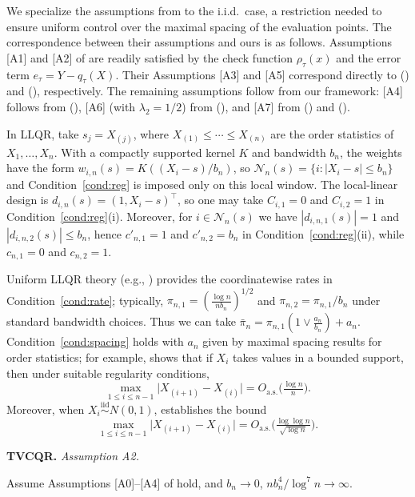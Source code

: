 \documentclass[lineno]{biometrika}
\begin{document}
\begin{remark}
We specialize the assumptions from \cite{kong2010uniform} to the i.i.d.\ case, a restriction needed to ensure uniform
control over the maximal spacing of the evaluation points. The correspondence between their assumptions and ours is as
follows. Assumptions [A1] and [A2] of \cite{kong2010uniform} are readily satisfied by the check function
$\rho_\tau(x)$ and the error term $e_\tau=Y-q_\tau(X)$. Their Assumptions [A3] and [A5] correspond directly to
() and (), respectively. The remaining assumptions follow from our framework: [A4] follows
from (), [A6] (with $\lambda_2=1/2$) from (), and [A7] from () and
().
\end{remark}

In LLQR, take $s_j=X_{(j)}$, where $X_{(1)}\le\cdots\le X_{(n)}$ are the order statistics of $X_1,\ldots,X_n$.
With a compactly supported kernel $K$ and bandwidth $b_n$, the weights have the form $w_{i,n}(s)=K((X_i-s)/b_n)$, so
$\mathcal N_n(s)=\{i:|X_i-s|\le b_n\}$ and Condition~\ref{cond:reg} is imposed only on this local window. The
local-linear design is $d_{i,n}(s)=(1,X_i-s)^\top$, so one may take $C_{i,1}=0$ and $C_{i,2}=1$ in
Condition~\ref{cond:reg}(i). Moreover, for $i\in\mathcal N_n(s)$ we have $|d_{i,n,1}(s)|=1$ and
$|d_{i,n,2}(s)|\le b_n$, hence $c'_{n,1}=1$ and $c'_{n,2}=b_n$ in Condition~\ref{cond:reg}(ii), while
$c_{n,1}=0$ and $c_{n,2}=1$.

Uniform LLQR theory (e.g., \cite{kong2010uniform}) provides the coordinatewise rates in Condition~\ref{cond:rate};
typically, $\pi_{n,1}= (\frac{\log n}{n b_n})^{1/2}$ and $\pi_{n,2}= \pi_{n,1}/b_n$ under standard bandwidth choices.
Thus we can take $\bar\pi_n=\pi_{n,1}(1\vee \frac{a_n}{b_n})+a_n$. Condition~\ref{cond:spacing} holds with $a_n$ given
by maximal spacing results for order statistics; for example, \cite{deheuvels1984strong} shows that if $X_i$ takes
values in a bounded support, then under suitable regularity conditions,
\[
\max_{1\le i\le n-1}\big|X_{(i+1)}-X_{(i)}\big|=O_{\mathrm{a.s.}}\!\big(\tfrac{\log n}{n}\big).
\]
Moreover, when $X_i\stackrel{\mathrm{iid}}{\sim}N(0,1)$, \cite{deheuvels1985limiting} establishes the bound
\[
\max_{1\le i\le n-1}\big|X_{(i+1)}-X_{(i)}\big|
=O_{\mathrm{a.s.}}\!\big(\tfrac{\log\log n}{\sqrt{\log n}}\big).
\]

\noindent\textbf{TVCQR.}
\textit{Assumption A2.}

Assume Assumptions [A0]--[A4] of \cite{wu2017nonparametric} hold, and $b_n\to 0$,
$nb_n^4/\log^7 n\to \infty$.
\end{document}
